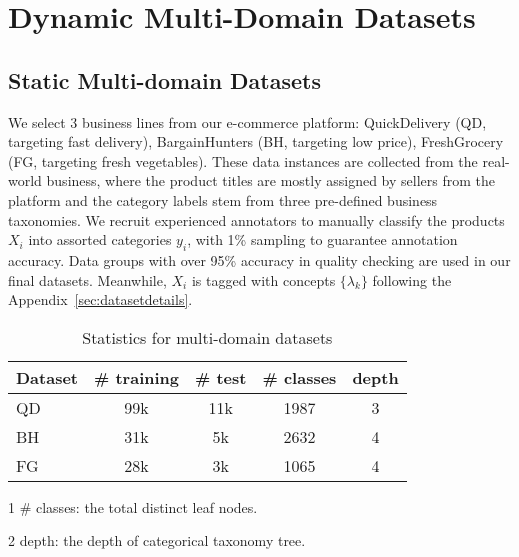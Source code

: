 \section{Dynamic Multi-Domain Datasets}
\subsection{Static Multi-domain Datasets}
We select 3 business lines from our e-commerce platform: 
QuickDelivery (QD, targeting fast delivery), BargainHunters (BH, targeting low price), FreshGrocery (FG, targeting fresh vegetables). 
These data instances 
are collected from the real-world business, where the product titles are mostly assigned by sellers from the platform and the category labels stem from three pre-defined business taxonomies. 
We recruit experienced annotators to manually classify the products $X_i$ into assorted categories $y_i$, with 1\% sampling to guarantee annotation accuracy. 
Data groups with over 95\% accuracy in quality checking are used in our final datasets. Meanwhile, $X_i$ is tagged with concepts $\{\lambda_k\}$ following the Appendix~\ref{sec:datasetdetails}.

\begin{table}[th]
\small
\centering
\begin{threeparttable}[b]
  \caption{Statistics for multi-domain datasets}
  \label{tb:dataset}
  \begin{tabular}{l|cccc}
    \toprule
    Dataset & \# training  & \# test  & \# classes & depth  \\
    \midrule
    \small{QD} & 99k & 11k & 1987 & 3   \\
    \small{BH} & 31k & 5k & 2632 & 4  \\
    \small{FG} & 28k & 3k & 1065 & 4  \\
    \bottomrule
  \end{tabular}
  \begin{tablenotes}
    \item[1] \# classes: the total distinct leaf nodes.
    \item[2] depth: the depth of categorical taxonomy tree.
  \end{tablenotes}
  \end{threeparttable}
\end{table}

